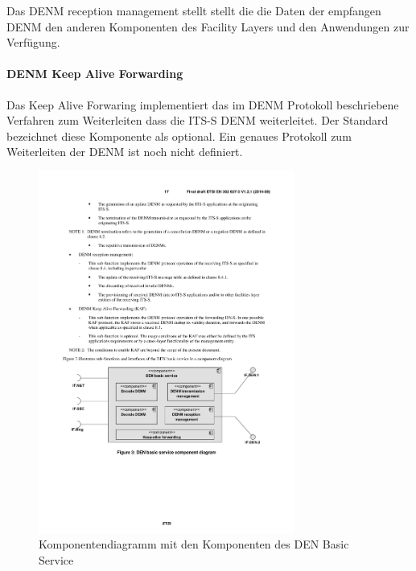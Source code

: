 Das \ac{DENM} reception management stellt stellt die die Daten der empfangen \ac{DENM} den anderen Komponenten des Facility Layers und den Anwendungen zur Verfügung.

\paragraph{DENM Keep Alive Forwarding}
Das Keep Alive Forwaring implementiert das im \ac{DENM} Protokoll beschriebene Verfahren zum Weiterleiten dass die \ac{ITS-S} \ac{DENM} weiterleitet. Der Standard \cite{en302637-3} bezeichnet diese Komponente als optional. Ein genaues Protokoll zum Weiterleiten der \ac{DENM} ist noch nicht definiert.




\begin{figure}[htbp]
	\includegraphics[width=0.75\textwidth]{content/images/04_facilitylayer/denBasicServiceKomponenten.pdf}
	\caption{Komponentendiagramm mit den Komponenten des DEN Basic Service \cite{en302637-3}}
	\label{fig:darstellungDenBasicServiceKomponenten}
\end{figure}

